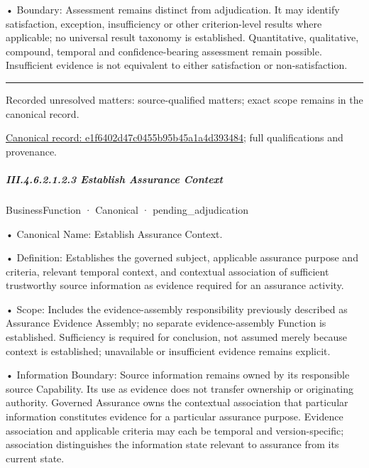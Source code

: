 •
Boundary: Assessment remains distinct from adjudication. It may identify satisfaction, exception, insufficiency or other criterion-level results where applicable; no universal result taxonomy is established. Quantitative, qualitative, compound, temporal and confidence-bearing assessment remain possible. Insufficient evidence is not equivalent to either satisfaction or non-satisfaction.



\medskip\hrule\medskip

{\small Recorded unresolved matters: source-qualified matters; exact scope remains in the canonical record.}\par
{\footnotesize \href{../../../../../../../continuum/business/business-function/e1f6402d47c0455b95b45a1a4d393484.md}{Canonical record: e1f6402d47c0455b95b45a1a4d393484}; full qualifications and provenance.}\par
\subparagraph*{III.4.6.2.1.2.3 Establish Assurance Context}
\label{navigation:III.4.6.2.1.2.3}

\label{element:ffffe352e28c4e878d986b0e15ddff15}
{\small BusinessFunction · Canonical · pending\_adjudication}\par

•
Canonical Name: Establish Assurance Context.



•
Definition: Establishes the governed subject, applicable assurance purpose and criteria, relevant temporal context, and contextual association of sufficient trustworthy source information as evidence required for an assurance activity.



•
Scope: Includes the evidence-assembly responsibility previously described as Assurance Evidence Assembly; no separate evidence-assembly Function is established. Sufficiency is required for conclusion, not assumed merely because context is established; unavailable or insufficient evidence remains explicit.



•
Information Boundary: Source information remains owned by its responsible source Capability. Its use as evidence does not transfer ownership or originating authority. Governed Assurance owns the contextual association that particular information constitutes evidence for a particular assurance purpose. Evidence association and applicable criteria may each be temporal and version-specific; association distinguishes the information state relevant to assurance from its current state.




